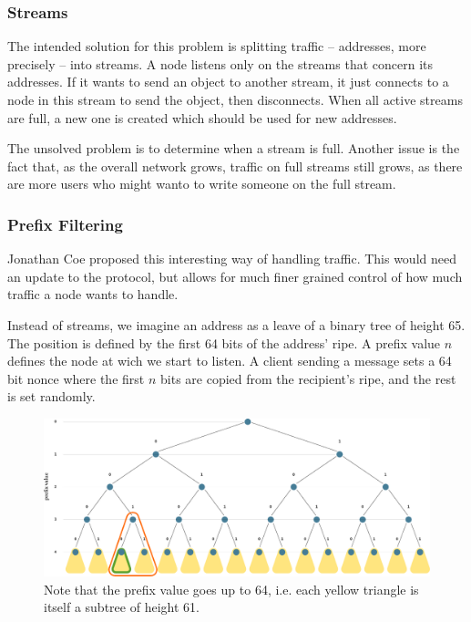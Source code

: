 \documentclass{bfh}
\begin{document}
  \subsubsection{Streams}
  The intended solution for this problem is splitting traffic -- addresses, more precisely -- into streams. A node listens only on the streams that concern its addresses. If it wants to send an object to another stream, it just connects to a node in this stream to send the object, then disconnects. When all active streams are full, a new one is created which should be used for new addresses.

  The unsolved problem is to determine when a stream is full. Another issue is the fact that, as the overall network grows, traffic on full streams still grows, as there are more users who might wanto to write someone on the full stream.

  \subsubsection{Prefix Filtering}
  Jonathan Coe proposed this interesting way of handling traffic. This would need an update to the protocol, but allows for much finer grained control of how much traffic a node wants to handle.\cite{wiki:prefixfilter}

  Instead of streams, we imagine an address as a leave of a binary tree of height 65. The position is defined by the first 64 bits of the address' ripe. A prefix value $n$ defines the node at wich we start to listen. A client sending a message sets a 64 bit nonce where the first $n$ bits are copied from the recipient's ripe, and the rest is set randomly.

  \begin{figure}[htp]
  \centering
  \includegraphics[width=\textwidth]{images/prefix-filter-binary-tree.pdf}
  \caption[prefix filter: binary tree]{Note that the prefix value goes up to 64, i.e. each yellow triangle is itself a subtree of height 61.}
  \label{fig:bintree}
  \end{figure}
\end{document}
